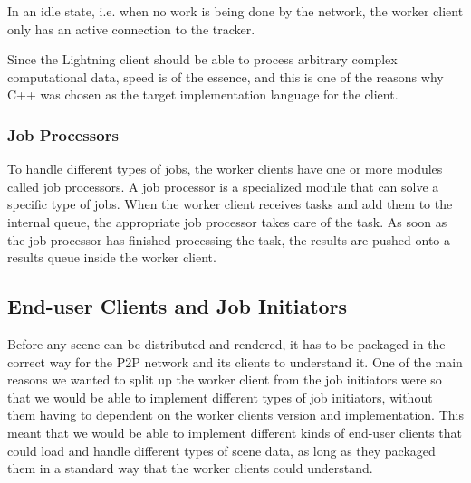 In an idle state, i.e. when no work is being done by the network, the worker client only has an active connection to the tracker.





Since the Lightning client should be able to process arbitrary complex computational data, speed is of the essence, and this is one of the reasons why C++ was chosen as the target implementation language for the client.

\subsubsection{Job Processors}
  To handle different types of jobs, the worker clients have one or more modules called job processors. A job processor is a specialized module that can solve a specific type of jobs. When the worker client receives tasks and add them to the internal queue, the appropriate job processor takes care of the task. As soon as the job processor has finished processing the task, the results are pushed onto a results queue inside the worker client.

\subsection{End-user Clients and Job Initiators}
Before any scene can be distributed and rendered, it has to be packaged in the correct way for the P2P network and its clients to understand it. One of the main reasons we wanted to split up the worker client from the job initiators were so that we would be able to implement different types of job initiators, without them having to dependent on the worker clients version and implementation. This meant that we would be able to implement different kinds of end-user clients that could load and handle different types of scene data, as long as they packaged them in a standard way that the worker clients could understand.

